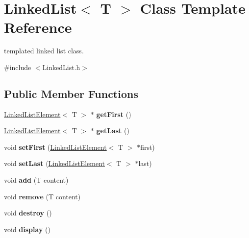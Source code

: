 \hypertarget{class_linked_list}{}\section{Linked\+List$<$ T $>$ Class Template Reference}
\label{class_linked_list}


templated linked list class.  




{\ttfamily \#include $<$Linked\+List.\+h$>$}

\subsection*{Public Member Functions}
\begin{DoxyCompactItemize}
\item 
\mbox{\label{class_linked_list_a6b2bd644e74fd8e47598b48dcefe77f9}} 
\mbox{\hyperlink{class_linked_list_element}{Linked\+List\+Element}}$<$ T $>$ $\ast$ {\bfseries get\+First} ()
\item 
\mbox{\label{class_linked_list_a13d8b4aae07e67358f99486469a5372f}} 
\mbox{\hyperlink{class_linked_list_element}{Linked\+List\+Element}}$<$ T $>$ $\ast$ {\bfseries get\+Last} ()
\item 
\mbox{\label{class_linked_list_a76c1cd46782c1f82064dc79dc69e4f80}} 
void {\bfseries set\+First} (\mbox{\hyperlink{class_linked_list_element}{Linked\+List\+Element}}$<$ T $>$ $\ast$first)
\item 
\mbox{\label{class_linked_list_ace865384dcd68eec6518e1b3d517da3a}} 
void {\bfseries set\+Last} (\mbox{\hyperlink{class_linked_list_element}{Linked\+List\+Element}}$<$ T $>$ $\ast$last)
\item 
\mbox{\label{class_linked_list_a3f64e4df133e336a6c3b0a705051ad44}} 
void {\bfseries add} (T content)
\item 
\mbox{\label{class_linked_list_a075f6a451dcf1df3ff8d00de07195cbd}} 
void {\bfseries remove} (T content)
\item 
\mbox{\label{class_linked_list_af9021d7ddb129042be3b581a16589e1c}} 
void {\bfseries destroy} ()
\item 
\mbox{\label{class_linked_list_ab43bd594a0f7f9ff21c96370da575693}} 
void {\bfseries display} ()
\end{DoxyCompactItemize}


